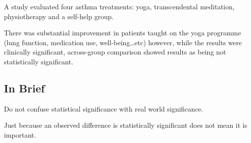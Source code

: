 \documentclass[
]{book}
\begin{document}
A study evaluated four asthma treatments: yoga, transcendental meditation, physiotherapy and a self-help group.

There was substantial improvement in patients taught on the yoga programme (lung function, medication use, well-being\ldots etc) however, while the results were clinically significant, across-group comparison showed results as being not statistically significant.

\hypertarget{in-brief}{%
\subsection{In Brief}\label{in-brief}}

Do not confuse statistical significance with real world significance.

Just because an observed difference is statistically significant does not mean it is important.

  
\end{document}
